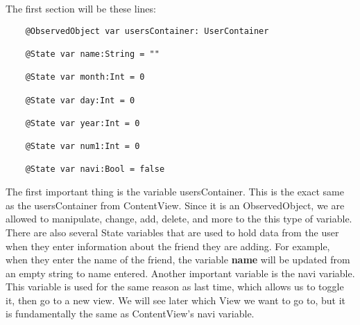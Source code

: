 \documentclass{article}
\theoremstyle{theorem}
\theoremstyle{definition}
\theoremstyle{remark}
\begin{document}
\noindent\newline The first section will be these lines:

\begin{verbatim}
    @ObservedObject var usersContainer: UserContainer
    
    @State var name:String = ""
    
    @State var month:Int = 0
    
    @State var day:Int = 0
    
    @State var year:Int = 0
    
    @State var num1:Int = 0
    
    @State var navi:Bool = false
\end{verbatim}

\noindent\newline The first important thing is the variable usersContainer. This is the exact same as the usersContainer from ContentView. Since it is an ObservedObject, we are allowed to manipulate, change, add, delete, and more to the this type of variable. There are also several State variables that are used to hold data from the user when they enter information about the friend they are adding. For example, when they enter the name of the friend, the variable \textbf{name} will be updated from an empty string to name entered. Another important variable is the navi variable. This variable is used for the same reason as last time, which allows us to toggle it, then go to a new view. We will see later which View we want to go to, but it is fundamentally the same as ContentView's navi variable.
\end{document}
